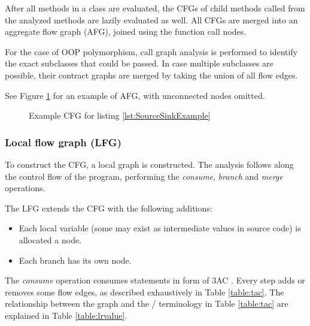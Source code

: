 After all methods in a class are evaluated,
the CFGs of child methods called from the analyzed methods
are lazily evaluated as well.
All CFGs are merged into an aggregate flow graph (AFG),
joined using the function call nodes.

For the case of OOP polymorphism,
call graph analysis is performed to identify
the exact subclasses that could be passed.
In case multiple subclasses are possible,
their contract graphs are merged by taking the union of all flow edges.

See Figure \ref{fig:SourceSinkContract} for an example of AFG,
with unconnected nodes omitted.

\begin{figure}
	\caption{Example CFG for listing \ref{lst:SourceSinkExample}}
	\begin{center}
	\end{center}
	\label{fig:SourceSinkContract}
\end{figure}

\subsubsection{Local flow graph (LFG)}
To construct the CFG,
a local graph is constructed.
The analysis follows along the control flow of the program,
performing the \emph{consume}, \emph{branch} and \emph{merge} operations.

The LFG extends the CFG with the following additions:
\begin{itemize}
	\item Each local variable (some may exist as intermediate values in source code)
		is allocated a node.
	\item Each branch has its own  node.
\end{itemize}

The \emph{consume} operation consumes statements in form of 3AC \cite{sootsurvivor}.
Every step adds or removes some flow edges,
as described exhaustively in Table \ref{table:tac}.
The relationship between the graph and the / terminology
in Table \ref{table:tac} are explained in Table \ref{table:lrvalue}.

